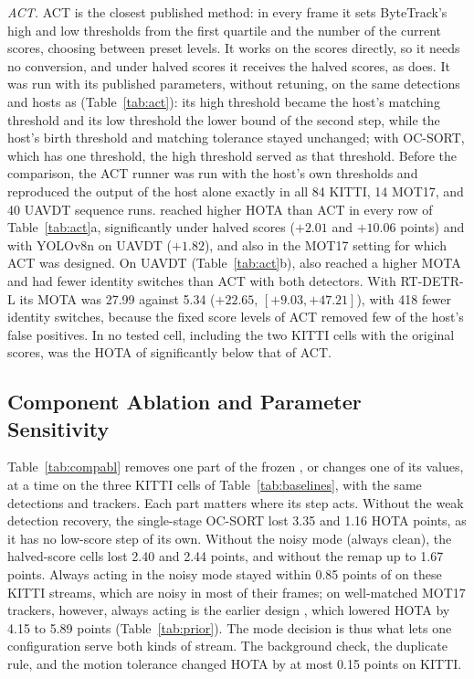 \emph{ACT.} ACT \cite{act2026adaptive} is the closest published method: in every frame it sets
ByteTrack's high and low thresholds from the first quartile and the number of the current scores,
choosing between preset levels. It works on the scores directly, so it needs no conversion, and
under halved scores it receives the halved scores, as \scl{} does. It was run with its published
parameters, without retuning, on the same detections and hosts as \scl{} (Table~\ref{tab:act}):
its high threshold became the host's matching threshold and its low threshold the lower bound of
the second step, while the host's birth threshold and matching tolerance stayed unchanged; with
OC-SORT, which has one threshold, the high threshold served as that threshold. Before the
comparison, the ACT runner was run with the host's own thresholds and reproduced the output of the
host alone exactly in all 84 KITTI, 14 MOT17, and 40 UAVDT sequence runs. \scl{} reached higher HOTA
than ACT in every row of Table~\ref{tab:act}a, significantly under halved
scores ($+2.01$ and $+10.06$ points) and with YOLOv8n on UAVDT ($+1.82$), and also in the MOT17
setting for which ACT was designed. On UAVDT (Table~\ref{tab:act}b), \scl{} also reached a higher
MOTA and had fewer identity switches than ACT with both detectors. With RT-DETR-L its MOTA was 27.99
against 5.34 ($+22.65$, $[+9.03,+47.21]$), with 418 fewer identity switches, because the fixed score
levels of ACT removed few of the host's false positives. In no tested cell, including the two KITTI cells with the
original scores, was the HOTA of \scl{} significantly below that of ACT.

\subsection{Component Ablation and Parameter Sensitivity}\label{sec:ablation}
Table~\ref{tab:compabl} removes one part of the frozen \scl{}, or changes one of its values, at a
time on the three KITTI cells of Table~\ref{tab:baselines}, with the same detections and trackers.
Each part matters where its step acts. Without the weak detection recovery, the single-stage
OC-SORT lost 3.35 and 1.16 HOTA points, as it has no low-score step of its own. Without the noisy
mode (always clean), the halved-score cells lost 2.40 and 2.44 points, and without the remap up to
1.67 points. Always acting in the noisy mode stayed within 0.85 points of \scl{} on these KITTI
streams, which are noisy in most of their frames; on well-matched MOT17 trackers, however, always
acting is the earlier design \aob{}, which lowered HOTA by 4.15 to 5.89 points
(Table~\ref{tab:prior}). The mode decision is thus what lets one configuration serve both kinds of
stream. The background check, the duplicate rule, and the motion tolerance changed HOTA by at most
0.15 points on KITTI.

